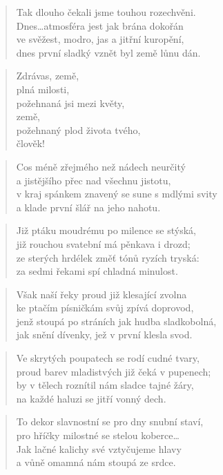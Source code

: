 \documentclass{book}
\begin{document}
\begin{verse}
Tak dlouho čekali jsme touhou rozechvěni.\\
Dnes\ldots atmosféra jest jak brána dokořán\\
ve svěžest, modro, jas a jitřní kuropění,\\
dnes první sladký vznět byl země lůnu dán.
\end{verse}
\begin{verse}
Zdrávas, země,\\
plná milosti,\\
požehnaná jsi mezi květy,\\
země,\\
požehnaný plod života tvého,\\
člověk!
\end{verse}
\begin{verse}
Cos méně zřejmého než nádech neurčitý\\
a jistějšího přec nad všechnu jistotu,\\
v kraj spánkem znavený se sune s mdlými svity\\
a klade první šlář na jeho nahotu.
\end{verse}
\begin{verse}
Již ptáku moudrému po milence se stýská,\\
již rouchou svatební má pěnkava i drozd;\\
ze sterých hrdélek změť tónů ryzích tryská:\\
za sedmi řekami spí chladná minulost.
\end{verse}
\begin{verse}
Však naší řeky proud již klesající zvolna\\
ke ptačím písničkám svůj zpívá doprovod,\\
jenž stoupá po stráních jak hudba sladkobolná,\\
jak snění dívenky, jež v první klesla svod.
\end{verse}
\begin{verse}
Ve skrytých poupatech se rodí cudné tvary,\\
proud barev mladistvých již čeká v pupenech;\\
by v tělech roznítil nám sladce tajné žáry,\\
na každé haluzi se jitří vonný dech.
\end{verse}
\begin{verse}
To dekor slavnostní se pro dny snubní staví,\\
pro hříčky milostné se stelou koberce\ldots\\
Jak lačné kalichy své vztyčujeme hlavy\\
a vůně omamná nám stoupá ze srdce.
\end{verse}
\end{document}
